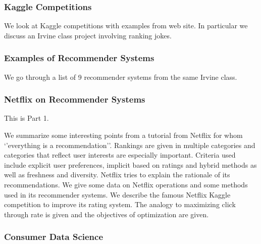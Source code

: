 

\subsubsection{Kaggle Competitions}\label{kaggle-competitions}

We look at Kaggle competitions with examples from web site. In
particular we discuss an Irvine class project involving ranking jokes.



\subsubsection{Examples of Recommender
Systems}\label{examples-of-recommender-systems}

We go through a list of 9 recommender systems from the same Irvine
class.



\subsubsection{Netflix on Recommender
Systems}\label{netflix-on-recommender-systems}

This is Part 1.

We summarize some interesting points from a tutorial from Netflix for
whom `'everything is a recommendation''. Rankings are given in multiple
categories and categories that reflect user interests are especially
important. Criteria used include explicit user preferences, implicit
based on ratings and hybrid methods as well as freshness and diversity.
Netflix tries to explain the rationale of its recommendations. We give
some data on Netflix operations and some methods used in its recommender
systems. We describe the famous Netflix Kaggle competition to improve
its rating system. The analogy to maximizing click through rate is given
and the objectives of optimization are given.



\subsubsection{Consumer Data Science}\label{consumer-data-science}

